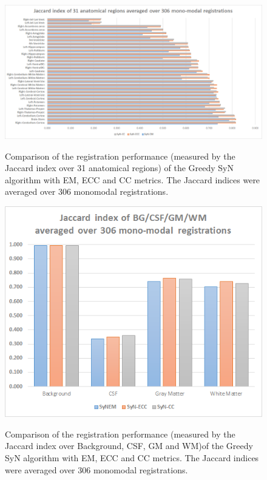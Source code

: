 


\begin{figure}[H]
\centering
\includegraphics[width=1.0\linewidth]{./images/mono_graph_seg.png}\\
\caption{Comparison of the registration performance (measured by the Jaccard index over 31 anatomical regions) of the Greedy SyN algorithm with EM, ECC and CC metrics. The Jaccard
indices were averaged over 306 monomodal registrations.}
\label{fig:mono_graph_seg}
\end{figure}

\begin{figure}[H]
\centering
\includegraphics[width=0.5\linewidth]{./images/mono_graph_segTri_fill.png}\\
\caption{Comparison of the registration performance (measured by the Jaccard index over Background, CSF, GM and WM)of the Greedy SyN algorithm with EM, ECC and CC metrics. The Jaccard
indices were averaged over 306 monomodal registrations.}
\label{fig:mono_graph_segTri_fill}
\end{figure}


